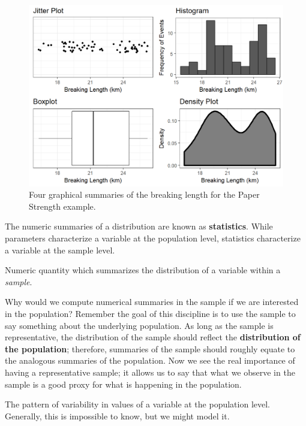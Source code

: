 \documentclass[]{book}
\theoremstyle{definition}
\theoremstyle{definition}
\theoremstyle{definition}
\theoremstyle{remark}
\let\BeginKnitrBlock\begin \let\EndKnitrBlock\end
\begin{document}
\begin{figure}

{\centering \includegraphics[width=0.8\linewidth]{./Images/summaries-univariate-1} 

}

\caption{Four graphical summaries of the breaking length for the Paper Strength example.}\label{fig:summaries-univariate}
\end{figure}

The numeric summaries of a distribution are known as
\textbf{statistics}. While parameters characterize a variable at the
population level, statistics characterize a variable at the sample
level.

\BeginKnitrBlock{definition}[Statistic]
\protect\hypertarget{def:defn-statistic}{}{\label{def:defn-statistic}
{} }Numeric quantity which summarizes the
distribution of a variable within a \emph{sample}.
\EndKnitrBlock{definition}

Why would we compute numerical summaries in the sample if we are
interested in the population? Remember the goal of this discipline is to
use the sample to say something about the underlying population. As long
as the sample is representative, the distribution of the sample should
reflect the \textbf{distribution of the population}; therefore,
summaries of the sample should roughly equate to the analogous summaries
of the population. Now we see the real importance of having a
representative sample; it allows us to say that what we observe in the
sample is a good proxy for what is happening in the population.

\BeginKnitrBlock{definition}[Distribution of the Population]
\protect\hypertarget{def:defn-distribution-population}{}{\label{def:defn-distribution-population}
{} }The pattern of
variability in values of a variable at the population level. Generally,
this is impossible to know, but we might model it.
\EndKnitrBlock{definition}
\end{document}
